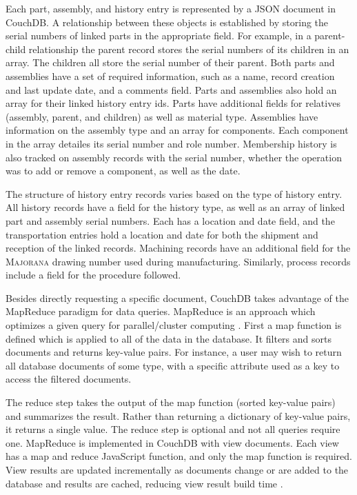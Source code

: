 \documentclass[journal]{IEEEtran}
\begin{document}
Each part, assembly, and history entry is represented by a JSON document in CouchDB. A relationship between these objects
is established by storing the serial numbers of linked parts in the appropriate field. For example, in a parent-child relationship the parent record stores the serial numbers
of its children in an array. The children all store the serial number of their parent. Both parts and assemblies have a set of 
required information, such as a name, record creation and last update date, and a comments field. Parts and assemblies also hold an array for
their linked history entry ids. 
Parts have additional fields for relatives (assembly, parent, and children) as well as material type. Assemblies have information
on the assembly type and an array for components. Each component in the array detailes its serial number and role number. Membership history is also tracked
on assembly records with the serial number, whether the operation was to add or remove a component, as well as the date.

The structure of history entry records varies based on the type of history entry. All history records have a field for the history type,
as well as an array of linked part and assembly serial numbers. Each has a location and date field, and the transportation entries
hold a location and date for both the shipment and reception of the linked records. Machining records have an additional field for the
\textsc{Majorana} drawing number used during manufacturing. Similarly, process records include a field for the procedure followed.

Besides directly requesting a specific document, CouchDB takes advantage of the MapReduce paradigm for data
queries. MapReduce is an approach which optimizes a given query for parallel/cluster computing \cite{mapreduce_dean}. First a map function
is defined which is applied to all of the data in the database. It filters and sorts documents and returns key-value
pairs. For instance, a user may wish to return all database documents of some type, with a specific attribute used as
a key to access the filtered documents. 

The reduce step takes the output of the map function (sorted key-value pairs) and summarizes the result. Rather than returning a dictionary
of key-value pairs, it returns a single value. The reduce
step is optional and not all queries require one. MapReduce is implemented in CouchDB with view documents. Each view has
a map and reduce JavaScript function, and only the map function is required. View results are updated incrementally as
documents change or are added to the database and results are cached, reducing view result build time \cite{couchdb_guide}.
\end{document}
